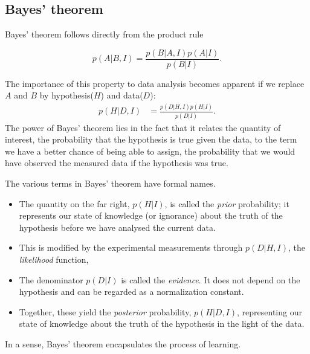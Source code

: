 \documentclass[%
oneside,                 %
final,                   %
10pt]{article}
\newenvironment{block_mdfboxadmon}[1][]{
\begin{block_mdfboxmdframed}[frametitle=#1]
}
{
\end{block_mdfboxmdframed}
}
\begin{document}
\subsection{Bayes' theorem}

\begin{block_mdfboxadmon}[]
Bayes' theorem follows directly from the product rule

\[
p(A|B,I) = \frac{p(B|A,I) p(A|I)}{p(B|I)}.
\]

The importance of this property to data analysis becomes apparent if we replace $A$ and $B$ by hypothesis($H$) and data($D$):
\begin{align}
p(H|D,I) &= \frac{p(D|H,I) p(H|I)}{p(D|I)}.
\label{eq:bayes}
\end{align}
The power of Bayes’ theorem lies in the fact that it relates the quantity of interest, the probability that the hypothesis is true given the data, to the term we have a better chance of being able to assign, the probability that we would have observed the measured data if the hypothesis was true.
\end{block_mdfboxadmon} %




\begin{block_mdfboxadmon}[]
The various terms in Bayes’ theorem have formal names. 
\begin{itemize}
\item The quantity on the far right, $p(H|I)$, is called the \emph{prior} probability; it represents our state of knowledge (or ignorance) about the truth of the hypothesis before we have analysed the current data. 

\item This is modified by the experimental measurements through $p(D|H,I)$, the \emph{likelihood} function, 

\item The denominator $p(D|I)$ is called the \emph{evidence}. It does not depend on the hypothesis and can be regarded as a normalization constant.

\item Together, these yield the \emph{posterior} probability, $p(H|D, I )$, representing our state of knowledge about the truth of the hypothesis in the light of the data. 
\end{itemize}

\noindent
In a sense, Bayes’ theorem encapsulates the process of learning.
\end{block_mdfboxadmon} %
\end{document}
